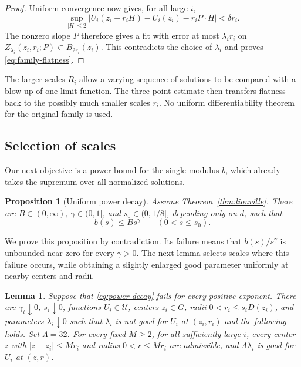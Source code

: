 \documentclass[11pt]{article}
\numberwithin{equation}{section}
\newtheorem{proposition}[theorem]{Proposition}
\newtheorem{lemma}[theorem]{Lemma}
\theoremstyle{definition}
\theoremstyle{remark}
\begin{document}
\begin{proof}
Uniform convergence now gives, for all large $i$,
\[
  \sup_{|H|\le2}|U_i(z_i+r_iH)-U_i(z_i)-r_iP\cdot H|
       <\delta r_i.
\]
The nonzero slope $P$ therefore gives a fit with error at most $\lambda_i r_i$ on $Z_{\lambda_i}(z_i,r_i;P)\subset B_{2r_i}(z_i)$. This contradicts the choice of $\lambda_i$ and proves \eqref{eq:family-flatness}.
\end{proof}

The larger scales $R_i$ allow a varying sequence of solutions to be compared with a blow-up of one limit function. The three-point estimate then transfers flatness back to the possibly much smaller scales $r_i$. No uniform differentiability theorem for the original family is used.

\subsection{Selection of scales}

Our next objective is a power bound for the single modulus $b$, which already takes the supremum over all normalized solutions.

\begin{proposition}[Uniform power decay]\label{prop:power-decay}
Assume Theorem~\ref{thm:liouville}. There are $B\in(0,\infty)$, $\gamma\in(0,1]$, and $s_0\in(0,1/8]$, depending only on $d$, such that
\begin{equation}\label{eq:power-decay}
  b(s)\le Bs^\gamma\qquad(0<s\le s_0).
\end{equation}
\end{proposition}

We prove this proposition by contradiction. Its failure means that $b(s)/s^\gamma$ is unbounded near zero for every $\gamma>0$. The next lemma selects scales where this failure occurs, while obtaining a slightly enlarged good parameter uniformly at nearby centers and radii.

\begin{lemma}\label{lem:bad-scales}
Suppose that \eqref{eq:power-decay} fails for every positive exponent. There are $\gamma_i\downarrow0$, $s_i\downarrow0$, functions $U_i\in\mathcal U$, centers $z_i\in G$, radii $0<r_i\le s_iD(z_i)$, and parameters $\lambda_i\downarrow0$ such that $\lambda_i$ is not good for $U_i$ at $(z_i,r_i)$ and the following holds. Set $\Lambda=32$. For every fixed $M\ge2$, for all sufficiently large $i$, every center $z$ with $|z-z_i|\le Mr_i$ and radius $0<r\le Mr_i$ are admissible, and $\Lambda\lambda_i$ is good for $U_i$ at $(z,r)$.
\end{lemma}
\end{document}
